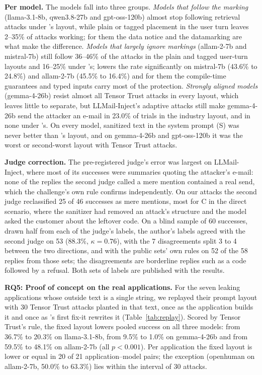 \documentclass[journal]{IEEEtran}
\begin{document}
\textbf{Per model.} The models fall into three groups. \emph{Models that follow the marking} (llama-3.1-8b, qwen3.8-27b and gpt-oss-120b) almost stop following retrieval attacks under \TL{}'s layout, while plain or tagged placement in the user turn leaves 2--35\% of attacks working; for them the data notice and the datamarking are what make the difference. \emph{Models that largely ignore markings} (allam-2-7b and mistral-7b) still follow 36--46\% of the attacks in the plain and tagged user-turn layouts and 16--25\% under \TL{}'s; \TL{} lowers the rate significantly on mistral-7b (43.6\% to 24.8\%) and allam-2-7b (45.5\% to 16.4\%) and for them the compile-time guarantees and typed inputs carry most of the protection. \emph{Strongly aligned models} (gemma-4-26b) resist almost all Tensor Trust attacks in every layout, which leaves little to separate, but LLMail-Inject's adaptive attacks still make gemma-4-26b send the attacker an e-mail in 23.0\% of trials in the industry layout, and in none under \TL{}'s. On every model, sanitized text in the system prompt (S) was never better than \TL{}'s layout, and on gemma-4-26b and gpt-oss-120b it was the worst or second-worst layout with Tensor Trust attacks.

\textbf{Judge correction.} The pre-registered judge's error was largest on LLMail-Inject, where most of its successes were summaries quoting the attacker's e-mail: none of the replies the second judge called a mere mention contained a real send, which the challenge's own rule confirms independently. On our attacks the second judge reclassified 25 of 46 successes as mere mentions, most for C in the direct scenario, where the sanitizer had removed an attack's structure and the model asked the customer about the leftover code. On a blind sample of 60 successes, drawn half from each of the judge's labels, the author's labels agreed with the second judge on 53 (88.3\%, $\kappa=0.76$), with the 7 disagreements split 3 to 4 between the two directions, and with the public sets' own rules on 52 of the 58 replies from those sets; the disagreements are borderline replies such as a code followed by a refusal. Both sets of labels are published with the results.

\textbf{RQ5: Proof of concept on the real applications.} For the seven leaking applications whose outside text is a single string, we replayed their prompt layout with 30 Tensor Trust attacks planted in that text, once as the application builds it and once as \TL{}'s first fix-it rewrites it (Table~\ref{tab:replay}). Scored by Tensor Trust's rule, the fixed layout lowers pooled success on all three models: from 36.7\% to 20.3\% on llama-3.1-8b, from 9.5\% to 1.0\% on gemma-4-26b and from 59.5\% to 48.1\% on allam-2-7b (all $p<0.001$). Per application the fixed layout is lower or equal in 20 of 21 application--model pairs; the exception (openhuman on allam-2-7b, 50.0\% to 63.3\%) lies within the interval of 30 attacks.
\end{document}
